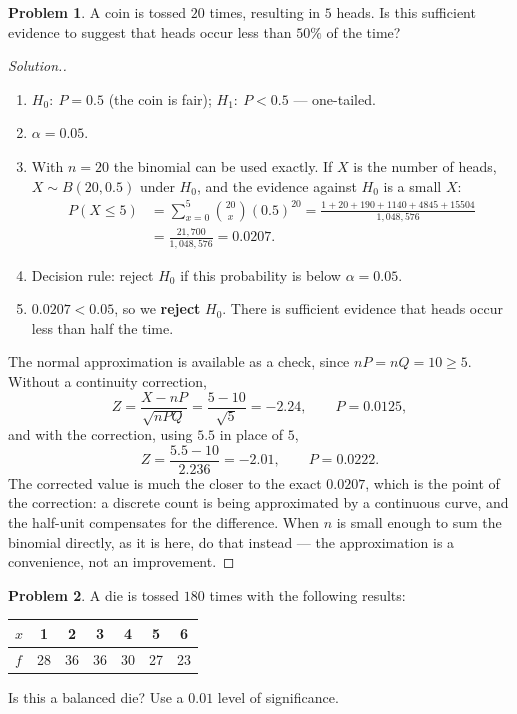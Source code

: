 \documentclass[11pt,a4paper]{article}
\theoremstyle{definition}
\newtheorem{problemx}{Problem}[section]
\newenvironment{problem}{\begin{problemx}}{\end{problemx}}
\newenvironment{solution}
  {\renewcommand{\qedsymbol}{}\begin{proof}[\textit{Solution}.]}
  {\end{proof}}
\begin{document}
\begin{problem}
A coin is tossed $20$ times, resulting in $5$ heads. Is this sufficient evidence to suggest
that heads occur less than $50\%$ of the time?
\end{problem}

\begin{solution}
\begin{enumerate}
\item $H_0:\ P=0.5$ (the coin is fair); $H_1:\ P<0.5$ --- one-tailed.
\item $\alpha=0.05$.
\item With $n=20$ the binomial can be used exactly. If $X$ is the number of heads,
$X\sim B(20,0.5)$ under $H_0$, and the evidence against $H_0$ is a small $X$:
\begin{align*}
P(X\leq 5)&=\sum_{x=0}^{5}\binom{20}{x}(0.5)^{20}
=\frac{1+20+190+1140+4845+15504}{1{,}048{,}576}\\
&=\frac{21{,}700}{1{,}048{,}576}=0.0207.
\end{align*}
\item Decision rule: reject $H_0$ if this probability is below $\alpha=0.05$.
\item $0.0207<0.05$, so we \textbf{reject} $H_0$. There is sufficient evidence that heads
occur less than half the time.
\end{enumerate}

The normal approximation is available as a check, since $nP=nQ=10\geq 5$. Without a
continuity correction,
\[Z=\frac{X-nP}{\sqrt{nPQ}}=\frac{5-10}{\sqrt{5}}=-2.24,\qquad P=0.0125,\]
and with the correction, using $5.5$ in place of $5$,
\[Z=\frac{5.5-10}{2.236}=-2.01,\qquad P=0.0222.\]
The corrected value is much the closer to the exact $0.0207$, which is the point of the
correction: a discrete count is being approximated by a continuous curve, and the half-unit
compensates for the difference. When $n$ is small enough to sum the binomial directly, as it
is here, do that instead --- the approximation is a convenience, not an improvement.
\end{solution}

\begin{problem}
A die is tossed $180$ times with the following results:
\begin{table}[H]
\centering
\begin{tabular}{l|cccccc}
$x$ & 1 & 2 & 3 & 4 & 5 & 6\\
\hline
$f$ & 28 & 36 & 36 & 30 & 27 & 23\\
\end{tabular}
\end{table}
Is this a balanced die? Use a $0.01$ level of significance.
\end{problem}
\end{document}
